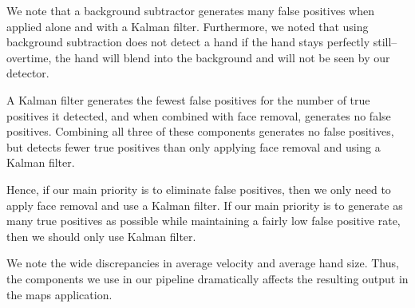 \documentclass[12pt]{article}
\begin{document}
We note that a background subtractor generates many false positives when applied alone and with a Kalman filter. Furthermore, we noted that using background subtraction does not detect a hand if the hand stays perfectly still--overtime, the hand will blend into the background and will not be seen by our detector. 

A Kalman filter generates the fewest false positives for the number of true positives it detected, and when combined with face removal, generates no false positives. Combining all three of these components generates no false positives, but detects fewer true positives than only applying face removal and using a Kalman filter. 

Hence, if our main priority is to eliminate false positives, then we only need to apply face removal and use a Kalman filter. If our main priority is to generate as many true positives as possible while maintaining a fairly low false positive rate, then we should only use Kalman filter.

We note the wide discrepancies in average velocity and average hand size. Thus, the components we use in our pipeline dramatically affects the resulting output in the maps application.
\end{document}
